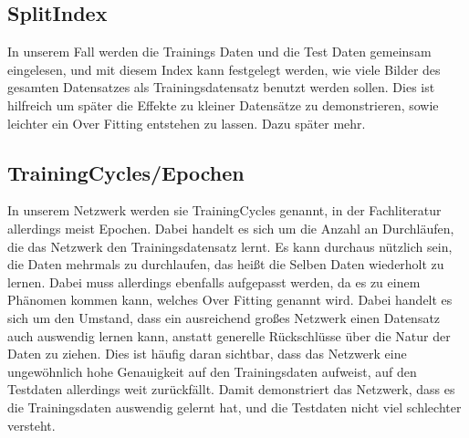 \documentclass[12pt]{article}
\begin{document}
\subsection{SplitIndex}
In unserem Fall werden die Trainings Daten und die Test Daten gemeinsam eingelesen, und mit diesem Index kann festgelegt werden, wie viele Bilder des gesamten Datensatzes als Trainingsdatensatz benutzt werden sollen. Dies ist hilfreich um später die Effekte zu kleiner Datensätze zu demonstrieren, sowie leichter ein Over Fitting entstehen zu lassen. Dazu später mehr.
\subsection{TrainingCycles/Epochen}
In unserem Netzwerk werden sie TrainingCycles genannt, in der Fachliteratur allerdings meist Epochen. Dabei handelt es sich um die Anzahl an Durchläufen, die das Netzwerk den Trainingsdatensatz lernt. Es kann durchaus nützlich sein, die Daten mehrmals zu durchlaufen, das heißt die Selben Daten wiederholt zu lernen. Dabei muss allerdings ebenfalls aufgepasst werden, da es zu einem Phänomen kommen kann, welches Over Fitting genannt wird. Dabei handelt es sich um den Umstand, dass ein ausreichend großes Netzwerk einen Datensatz auch auswendig lernen kann, anstatt generelle Rückschlüsse über die Natur der Daten zu ziehen. Dies ist häufig daran sichtbar, dass das Netzwerk eine ungewöhnlich hohe Genauigkeit auf den Trainingsdaten aufweist, auf den Testdaten allerdings weit zurückfällt. Damit demonstriert das Netzwerk, dass es die Trainingsdaten auswendig gelernt hat, und die Testdaten nicht viel schlechter versteht. 
\end{document}
